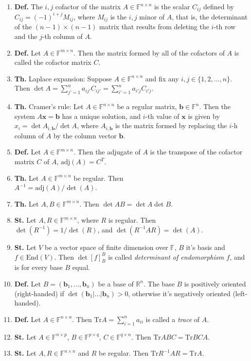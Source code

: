 \documentclass{article}
\newcommand{\<}{\left<}
\renewcommand{\>}{\right>}
\newcommand{\End}{\text{End}}
\newcommand{\adj}{\text{adj}}
\newcommand{\Tr}{\text{Tr}}
\newcommand{\R}{\mathbb{R}}
\newcommand{\F}{\mathbb{F}}
\newcommand{\define}{\textbf{Def. }}
\newcommand{\state}{\textbf{St. }}
\newcommand{\theor}{\textbf{Th. }}
\begin{document}
\begin{multicols}{3}
\begin{enumerate}[itemsep=2pt, topsep=2pt, partopsep=2pt, parsep=2pt]
        \item \define The $i,j$ cofactor of the matrix $A\in\F^{n\times n}$ is the scalar $C_{ij}$ defined by $C_{ij}=(-1)^{i+j}M_{ij}$, where $M_{ij}$ is the $i,j$ minor of $A$, that is, the determinant of the $(n-1)\times(n-1)$ matrix that results from deleting the $i$-th row and the $j$-th column of $A$.
        \item \define Let $A\in\F^{m\times n}$. Then the matrix formed by all of the cofactors of $A$ is called the cofactor matrix $C$.
        \item \theor Laplace expansion: Suppose $A\in\F^{n\times n}$ and fix any $i,j\in\{1,2,\ldots,n\}$. Then $\det A=\sum_{j'=1}^na_{ij'}C_{ij'}=\sum_{i'=1}^na_{i'j}C_{i'j}$.
        \item \theor Cramer's rule: Let $A\in\F^{n\times n}$ be a regular matrix, $\bm b\in\F^n$. Then the system $A\bm x=\bm b$ has a unique solution, and $i$-th value of $\bm x$ is given by $x_i=\det A_{i,\bm b}/\det A$, where $A_{i,\bm b}$ is the matrix formed by replacing the $i$-h column of $A$ by the column vector $\bm b$.
        \item \define Let $A\in\F^{m\times n}$. Then the adjugate of $A$ is the transpose of the cofactor matrix $C$ of $A$, $\adj(A)=C^T$.
        \item \theor Let $A\in\F^{m\times n}$ be regular. Then\\ $A^{-1}=\adj(A)/\det(A)$.
        \item \theor Let $A,B\in\F^{m\times n}$. Then $\det AB=\det A\det B$.
        \item \state Let $A,R\in\F^{m\times n}$, where $R$ is regular. Then\\ $\det(R^{-1})=1/\det(R)$, and $\det(R^{-1}AR)=\det(A)$.
        \item \state Let $V$ be a vector space of finite dimension over $\F$, $B$ it's basis and $f\in\End\left(V\right)$. Then $\det\left[f\right]_B^B$ is called \emph{determinant of endomorphism $f$}, and is for every base $B$ equal.
        \item \define Let $B=\left(\bm b_1,\ldots,\bm b_n\right)$ be a base of $\R^n$. The base $B$ is positively oriented (right-handed) if $\det\left(\bm b_1|\ldots|\bm b_n\right)>0$, otherwise it's negatively oriented (left-handed).
        \item \define Let $A\in\F^{n\times n}$. Then $\Tr A=\sum_{i=1}^na_{ii}$ is called a \emph{trace} of $A$.
        \item \state Let $A\in\F^{n\times p}$, $B\in\F^{p\times q}$, $C\in\F^{q\times n}$. Then $\Tr ABC=\Tr BCA$.
        \item \state Let $A,R\in\F^{n\times n}$ and $R$ be regular. Then $\Tr R^{-1}AR=\Tr A$.


\end{enumerate}
\end{multicols}
\end{document}
